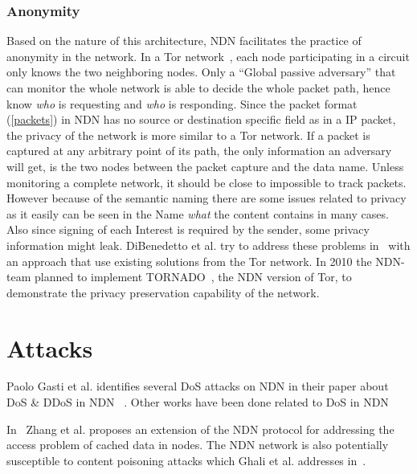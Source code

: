 \subsubsection{Anonymity}
Based on the nature of this architecture, \gls{NDN} facilitates the practice of anonymity in the network. 
In a Tor network~\cite{DBLP:conf/uss/DingledineMS04}, each node participating in a circuit only knows the two neighboring nodes.
Only a ``Global passive adversary'' that can monitor the whole network is able to decide the whole packet path, hence know \textit{who} is requesting and \textit{who} is responding.
Since the packet format (\autoref{packets}) in \gls{NDN} has no source or destination specific field as in a \gls{IP} packet, the privacy of the network is more similar to a Tor network.
If a packet is captured at any arbitrary point of its path, the only information an adversary will get, is the two nodes between the packet capture and the data name. 
Unless monitoring a complete network, it should be close to impossible to track packets.  
However because of the semantic naming there are some issues related to privacy as it easily can be seen in the Name \textit{what} the content contains in many cases.
Also since signing of each Interest is required by the sender, some privacy information might leak.
DiBenedetto et al. try to address these problems in~\cite{DBLP:conf/ndss/DiBenedettoGTU12} with an approach that use existing solutions from the Tor network.
In 2010 the \gls{NDN}-team planned to implement TORNADO~\cite[Section 3.7]{NDN-0001}, the \gls{NDN} version of Tor, to demonstrate the privacy preservation capability of the network.


\section{Attacks}

Paolo Gasti et al. identifies several \gls{DoS} attacks on \gls{NDN} in their paper about \gls{DoS} \& \gls{DDoS} in \gls{NDN} ~\cite{DBLP:conf/icccn/GastiTU013}. Other works have been done related to \gls{DoS} in \gls{NDN}~\cite{DBLP:journals/ijcomsys/WangCZQZ14, DBLP:conf/ancs/SoNO13, DBLP:journals/corr/abs-1303-4823}

In~\cite{DBLP:journals/tifs/LiZZSF15} Zhang et al. proposes an extension of the \gls{NDN} protocol for addressing the access problem of cached data in nodes.  
The \gls{NDN} network is also potentially susceptible to content poisoning attacks which Ghali et al. addresses in~\cite{DBLP:journals/ccr/GhaliTU14}.

